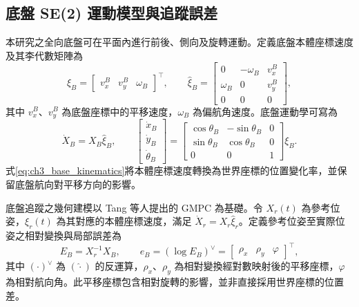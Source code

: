 \subsection{底盤 SE(2) 運動模型與追蹤誤差}
\label{subsec:base_se2_model_error}

本研究之全向底盤可在平面內進行前後、側向及旋轉運動。定義底盤本體座標速度及其李代數矩陣為
\begin{equation}
    \xi_B =
    \begin{bmatrix}
        v_x^B & v_y^B & \omega_B
    \end{bmatrix}^{\top},
    \qquad
    \widehat{\xi}_B =
    \begin{bmatrix}
        0 & -\omega_B & v_x^B \\
        \omega_B & 0 & v_y^B \\
        0 & 0 & 0
    \end{bmatrix},
    \label{eq:ch3_body_velocity_hat}
\end{equation}
其中 $v_x^B$、$v_y^B$ 為底盤座標中的平移速度，$\omega_B$ 為偏航角速度。底盤運動學可寫為
\begin{equation}
    \dot{X}_B = X_B\widehat{\xi}_B,
    \qquad
    \begin{bmatrix}
        \dot{x}_B \\
        \dot{y}_B \\
        \dot{\theta}_B
    \end{bmatrix}
    =
    \begin{bmatrix}
        \cos\theta_B & -\sin\theta_B & 0 \\
        \sin\theta_B & \cos\theta_B & 0 \\
        0 & 0 & 1
    \end{bmatrix}
    \xi_B.
    \label{eq:ch3_base_kinematics}
\end{equation}
式\eqref{eq:ch3_base_kinematics}將本體座標速度轉換為世界座標的位置變化率，並保留底盤航向對平移方向的影響。

底盤追蹤之幾何建模以 Tang 等人\cite{tang2024gmpc}提出的 GMPC 為基礎。令 $X_r(t)$ 為參考位姿，$\xi_r(t)$ 為其對應的本體座標速度，滿足 $\dot{X}_r=X_r\widehat{\xi}_r$。定義參考位姿至實際位姿之相對變換與局部誤差為
\begin{equation}
    E_B = X_r^{-1}X_B,
    \qquad
    e_B = \left(\log E_B\right)^{\vee}
    =
    \begin{bmatrix}
        \rho_x & \rho_y & \varphi
    \end{bmatrix}^{\top},
    \label{eq:ch3_geometric_tracking_error}
\end{equation}
其中 $(\cdot)^{\vee}$ 為 $(\widehat{\cdot})$ 的反運算，$\rho_x$、$\rho_y$ 為相對變換經對數映射後的平移座標，$\varphi$ 為相對航向角。此平移座標包含相對旋轉的影響，並非直接採用世界座標的位置差。

